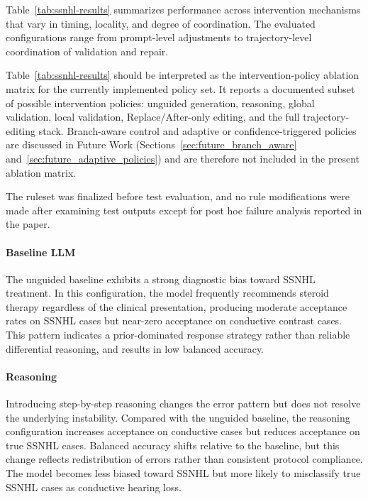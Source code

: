 \documentclass[twocolumn]{article}
\begin{document}
Table~\ref{tab:ssnhl-results} summarizes performance across intervention
mechanisms that vary in timing, locality, and degree of coordination. The
evaluated configurations range from prompt-level adjustments to trajectory-level
coordination of validation and repair.

Table~\ref{tab:ssnhl-results} should be interpreted as the intervention-policy
ablation matrix for the currently implemented policy set. It reports a
documented subset of possible intervention policies: unguided generation,
reasoning, global validation, local validation, Replace/After-only editing, and
the full trajectory-editing stack. Branch-aware control and adaptive or
confidence-triggered policies are discussed in Future Work
(Sections~\ref{sec:future_branch_aware} and~\ref{sec:future_adaptive_policies})
and are therefore not included in the present ablation matrix.

The ruleset was finalized before test evaluation, and no rule modifications were
made after examining test outputs except for post hoc failure analysis reported
in the paper.

\paragraph{Baseline LLM}

The unguided baseline exhibits a strong diagnostic bias toward SSNHL treatment.
In this configuration, the model frequently recommends steroid therapy
regardless of the clinical presentation, producing moderate acceptance rates on
SSNHL cases but near-zero acceptance on conductive contrast cases. This pattern
indicates a prior-dominated response strategy rather than reliable differential
reasoning, and results in low balanced accuracy.

\paragraph{Reasoning}

Introducing step-by-step reasoning changes the error pattern but does not
resolve the underlying instability. Compared with the unguided baseline, the
reasoning configuration increases acceptance on conductive cases but reduces
acceptance on true SSNHL cases. Balanced accuracy shifts relative to the
baseline, but this change reflects redistribution of errors rather than
consistent protocol compliance. The model becomes less biased toward SSNHL but
more likely to misclassify true SSNHL cases as conductive hearing loss.
\end{document}
